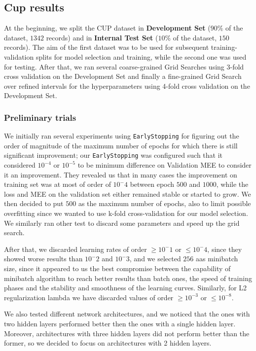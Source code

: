 \subsection{Cup results}

At the beginning, we split the CUP dataset in \textbf{Development Set} ($90\%$ of the dataset, $1342$ records) and in  \textbf{Internal Test Set} ($10\%$ of the dataset, $150$ records). The aim of the first dataset was to be used for subsequent training-validation splits for model selection and training, while the second one was used for testing. After that, we ran several coarse-grained Grid Searches using 3-fold cross validation on the Development Set and finally a fine-grained Grid Search over refined intervals for the hyperparameters using 4-fold cross validation on the Development Set.

\subsubsection{Preliminary trials}

We initially ran several experiments using \texttt{EarlyStopping} \cite{haykin2009neural} for figuring out the order of magnitude of the maximum number of epochs for which there is still significant improvement; our \texttt{EarlyStopping} was configured such that it considered $10^{-4}$ or $10^{-5}$ to be minimum difference on Validation MEE to consider it an improvement. They revealed us that in many cases the improvement on training set was at most of order of $10^-4$ between epoch $500$ and $1000$, while the loss and MEE on the validation set either remained stable or started to grow. We then decided to put $500$ as the maximum number of epochs, also to limit possible overfitting since we wanted to use k-fold cross-validation for our model selection. We similarly ran other test to discard some parameters and speed up the grid search. 

After that, we discarded learning rates of order $ \geq 10^-1$ or $\leq 10^-4$, since they showed worse results than $10^-2$ and $10^-3$, and we selected $256$ aas minibatch size, since it appeared to us the best compromise between the capability of minibatch algorithm to reach better results than batch ones, the speed of training phases and the stability and smoothness of the learning curves. Similarly, for L2 regularization lambda we have discarded values of order $\ge 10^{-3}$ or $\le 10^{-8}$.

We also tested different network architectures, and we noticed that the ones with two hidden layers performed better then the ones with a single hidden layer. Moreover, architectures with three hidden layers did not perform better than the former, so we decided to focus on architectures with 2 hidden layers.

